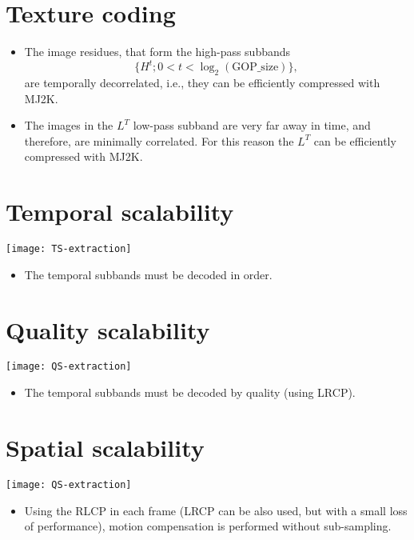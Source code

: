 \section{Texture coding}
\begin{itemize}
\item The image residues, that form the high-pass subbands
  $$\{H^t;0<t<\log_2(\text{GOP\_size})\},$$ are temporally
  decorrelated, i.e., they can be efficiently compressed with MJ2K.
\item The images in the $L^T$ low-pass subband are very far away in
  time, and therefore, are minimally correlated. For this reason the
  $L^T$ can be efficiently compressed with MJ2K.
\end{itemize}

\section{Temporal scalability}
\begin{center}
  \texttt{[image: TS-extraction]}
\end{center}
\begin{itemize}
\item The temporal subbands must be decoded in order.
\end{itemize}

\section{Quality scalability}
\begin{center}
  \texttt{[image: QS-extraction]}
\end{center}
\begin{itemize}
\item The temporal subbands must be decoded by quality (using LRCP).
\end{itemize}

\section{Spatial scalability}
\vspace{-1ex}
\begin{center}
  \texttt{[image: QS-extraction]}
\end{center}
\vspace{-2ex}
\begin{itemize}
\item Using the RLCP in each frame (LRCP can be also used, but with a
  small loss of performance), motion compensation is performed without
  sub-sampling.
\end{itemize}

